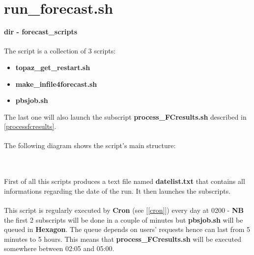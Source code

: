 \documentclass[12pt,a4paper]{report}
\begin{document}
\section{run\_forecast.sh}
\label{runforecast}
\textbf{dir - forecast\_scripts}
\\ \\
The script is a collection of 3 scripts:
\begin{itemize}
\item \textbf{topaz\_get\_restart.sh}
\item \textbf{make\_infile4forecast.sh}
\item \textbf{pbsjob.sh}
\end{itemize}
The last one will also launch the subscript \textbf{process\_FCresults.sh} described in \ref{processfcresults}.
\\ \\
The following diagram shows the script's main structure:
\begin{figure}[h!]
\centering
{}
\caption{}
\label{runfc}
\end{figure}
\\ \\
First of all this scripts produces a text file named \textbf{datelist.txt} that contains all informations regarding the date of the run. It then launches the subscripts.
\\ \\
This script is regularly executed by \textbf{Cron} (see [\ref{cron}]) every day at 0200 - \textbf{NB} the first 2 subscripts will be done in a couple of minutes but \textbf{pbsjob.sh} will be queued in \textbf{Hexagon}. The queue depends on users' requests hence can last from 5 minutes to 5 hours. This means that \textbf{process\_FCresults.sh} will be executed somewhere between 02:05 and 05:00.
\end{document}
